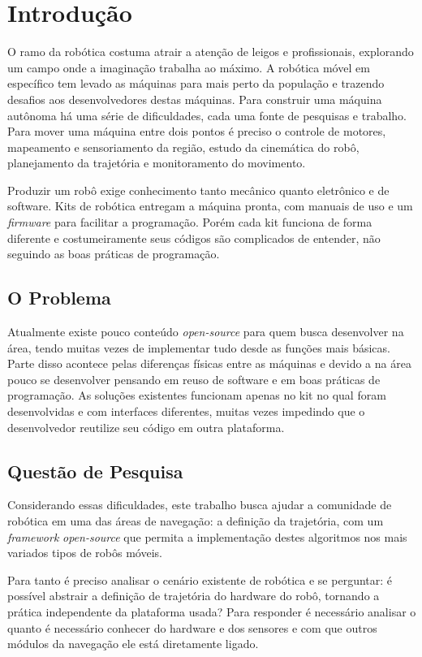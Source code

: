 \chapter[Introdução]{Introdução}

O ramo da robótica costuma atrair a atenção de leigos e profissionais, explorando um campo onde a imaginação trabalha ao máximo. A robótica móvel em específico tem levado as máquinas para mais perto da população e trazendo desafios aos desenvolvedores destas máquinas. Para construir uma máquina autônoma há uma série de dificuldades, cada uma fonte de pesquisas e trabalho. Para mover uma máquina entre dois pontos é preciso o controle de motores, mapeamento e sensoriamento da região, estudo da cinemática do robô, planejamento da trajetória e monitoramento do movimento.

Produzir um robô exige conhecimento tanto mecânico quanto eletrônico e de software. Kits de robótica entregam a máquina pronta, com manuais de uso e um \textit{firmware} para facilitar a programação. Porém cada kit funciona de forma diferente e costumeiramente seus códigos são complicados de entender, não seguindo as boas práticas de programação.

\section{O Problema}

Atualmente existe pouco conteúdo \textit{open-source} para quem busca desenvolver na área, tendo muitas vezes de implementar tudo desde as funções mais básicas. Parte disso acontece pelas diferenças físicas entre as máquinas e devido a na área pouco se desenvolver pensando em reuso de software e em boas práticas de programação. As soluções existentes funcionam apenas no kit no qual foram desenvolvidas e com interfaces diferentes, muitas vezes impedindo que o desenvolvedor reutilize seu código em outra plataforma.

\section{Questão de Pesquisa}

Considerando essas dificuldades, este trabalho busca ajudar a comunidade de robótica em uma das áreas de navegação: a definição da trajetória, com um \textit{framework} \textit{open-source} que permita a implementação destes algoritmos nos mais variados tipos de robôs móveis.

Para tanto é preciso analisar o cenário existente de robótica e se perguntar: é possível abstrair a definição de trajetória do hardware do robô, tornando a prática independente da plataforma usada? Para responder é necessário analisar o quanto é necessário conhecer do hardware e dos sensores e com que outros módulos da navegação ele está diretamente ligado.

